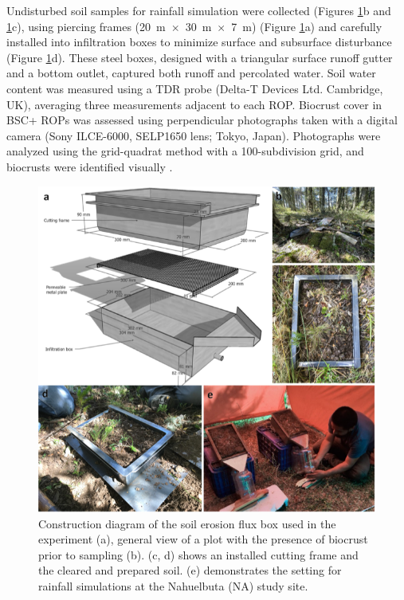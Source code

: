 Undisturbed soil samples for rainfall simulation were collected (Figures \ref{fig:sampling-panel}b and \ref{fig:sampling-panel}c), using piercing frames (\SI{20}{\meter}~$\times$~\SI{30}{\meter}~$\times$~\SI{7}{\meter}) (Figure \ref{fig:sampling-panel}a) and carefully installed into infiltration boxes to minimize surface and subsurface disturbance (Figure \ref{fig:sampling-panel}d). These steel boxes, designed with a triangular surface runoff gutter and a bottom outlet, captured both runoff and percolated water. Soil water content was measured using a TDR probe (Delta-T Devices Ltd. Cambridge, UK), averaging three measurements adjacent to each ROP. Biocrust cover in BSC+ ROPs was assessed using perpendicular photographs taken with a digital camera (Sony ILCE-6000, SELP1650 lens; Tokyo, Japan). Photographs were analyzed using the grid-quadrat method with a 100-subdivision grid, and biocrusts were identified visually \citep{Belnap2001}.

\begin{figure}[h!]
	\centering
	\includegraphics[width=1\textwidth]{img/sampling-panel.png}
	\caption{Construction diagram of the soil erosion flux box used in the experiment (a), general view of a plot with the presence of biocrust prior to sampling (b). (c, d) shows an installed cutting frame and the cleared and prepared soil. (e) demonstrates the setting for rainfall simulations at the Nahuelbuta (NA) study site.}
	\label{fig:sampling-panel}
\end{figure}

